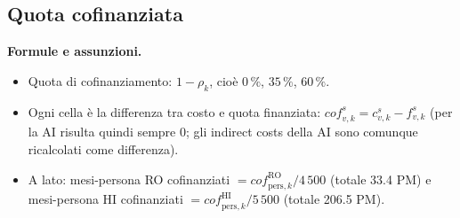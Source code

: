 \documentclass{plan4ari_report}
\begin{document}
\subsection{Quota cofinanziata}
\textbf{Formule e assunzioni.}
\begin{itemize}
  \item Quota di cofinanziamento: $1-\rho_k$, cio\`e $0\,\%$, $35\,\%$, $60\,\%$.
  \item Ogni cella \`e la differenza tra costo e quota finanziata: $\mathit{cof}^{s}_{v,k} = c^{s}_{v,k} - f^{s}_{v,k}$ (per la AI risulta quindi sempre 0; gli indirect costs della AI sono comunque ricalcolati come differenza).
  \item A lato: mesi-persona RO cofinanziati $=\mathit{cof}^{\mathrm{RO}}_{\mathrm{pers},k}/4\,500$ (totale 33.4 PM) e mesi-persona HI cofinanziati $=\mathit{cof}^{\mathrm{HI}}_{\mathrm{pers},k}/5\,500$ (totale 206.5 PM).
\end{itemize}
\end{document}
